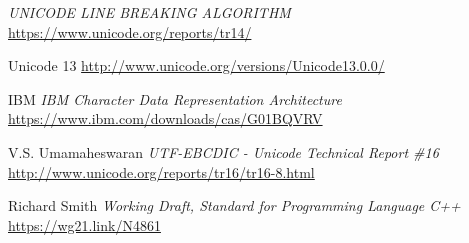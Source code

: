 \documentclass{wg21}
\begin{document}
\begin{thebibliography}{9}
    
    \emph{UNICODE LINE BREAKING ALGORITHM}\newline
    \url{https://www.unicode.org/reports/tr14/}
    
    Unicode 13\newline
    \url{http://www.unicode.org/versions/Unicode13.0.0/}
    
    IBM\newline
    \emph{IBM Character Data Representation Architecture}\newline
    \url{https://www.ibm.com/downloads/cas/G01BQVRV}
    
    
    V.S. Umamaheswaran\newline
    \emph{UTF-EBCDIC - Unicode Technical Report \#16}\newline
    \url{http://www.unicode.org/reports/tr16/tr16-8.html}

    Richard Smith
    \emph{Working Draft, Standard for Programming Language C++}\newline
    \url{https://wg21.link/N4861}

\end{thebibliography}
\end{document}

